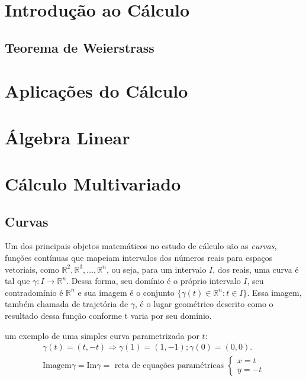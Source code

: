 \documentclass[
  letterpaper,
  DIV=11,
  numbers=noendperiod]{scrreprt}
\begin{document}
\part{Introdução ao Cálculo}

\chapter{Teorema de Weierstrass}\label{sec-weierstrass}

\part{Aplicações do Cálculo}

\part{Álgebra Linear}

\chapter{}\label{section}

\part{Cálculo Multivariado}

\chapter{Curvas}\label{curvas}

Um dos principais objetos matemáticos no estudo de cálculo são as
\emph{curvas}, funções contínuas que mapeiam intervalos dos números
reais para espaços vetoriais, como
\(\mathbb{R}^2, \mathbb{R}^3,\ldots,\mathbb{R}^n\), ou seja, para um
intervalo \(I\), dos reais, uma curva é tal que
\(\gamma : I \rightarrow \mathbb{R}^n\). Dessa forma, seu domínio é o
próprio intervalo \(I\), seu contradomínio é \(\mathbb{R}^n\) e sua
imagem é o conjunto \(\{\gamma(t) \in \mathbb{R}^n : t \in I\}\). Essa
imagem, também chamada de trajetória de \(\gamma\), é o lugar geométrico
descrito como o resultado dessa função conforme t varia por seu domínio.

um exemplo de uma simples curva parametrizada por \(t\): \[
\begin{aligned}
    \gamma(t) = (t, -t) \Rightarrow \gamma(1) = (1, -1); \gamma(0) = (0,0). \\ 
    \mathrm{Imagem}\gamma = \mathrm{Im}\gamma =
    \text{ reta de equações paramétricas } 
    \begin{cases}
        x = t \\
        y = -t
    \end{cases}
\end{aligned}
\]
\end{document}
